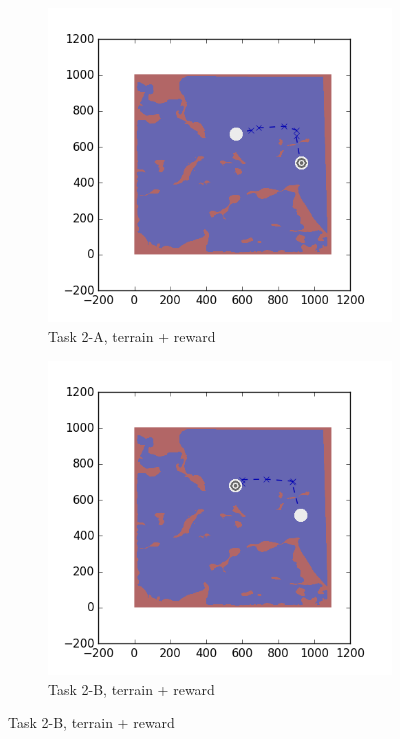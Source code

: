 \documentclass{tamuccthesis}
\begin{document}
\begin{figure}[H]
    \begin{subfigure}[b]{0.4\textwidth}
        \centering
        \includegraphics[width=\textwidth,trim={4cm 3cm 2cm 3cm},clip]{EXP3RG_PathBa_-1_-1_0_-1.png}
        \caption{Task 2-A, terrain + reward}
        \label{fig:Path_2-A_terrain_reward}
    \end{subfigure}
    \hfill
    \begin{subfigure}[b]{0.4\textwidth}  
        \centering 
        \includegraphics[width=\textwidth,trim={4cm 3cm 2cm 3cm},clip]{EXP3RG_PathBb_-1_-1_0_-1.png}
        \caption{Task 2-B, terrain + reward}
        \label{fig:Path_2-B_terrain_reward}
    \end{subfigure}
    

\end{figure}
\end{document}
